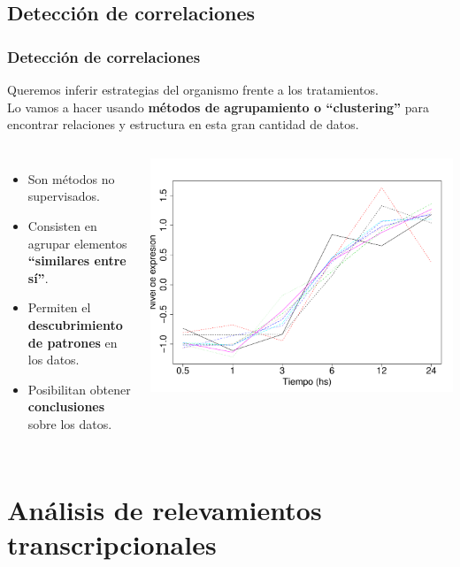\documentclass[serif,9pt, t]{beamer}
\begin{document}
\subsection{Detección de correlaciones}
\begin{frame}\frametitle{Detección de correlaciones} 
Queremos inferir estrategias del organismo frente a los tratamientos.\\\bigskip
Lo vamos a hacer usando \textbf{métodos de agrupamiento o ``clustering''} para encontrar relaciones y estructura en esta gran cantidad de datos.\medskip
\begin{columns}[T]
\begin{itemize}
\item Son métodos no supervisados.
\item Consisten en agrupar elementos \textbf{``similares entre sí''}.
\item Permiten el \textbf{descubrimiento de patrones} en los datos.
\item Posibilitan obtener \textbf{conclusiones} sobre los datos.
\end{itemize}
\centering
\includegraphics[width=1\textwidth]{perfiles_coregulados.pdf}
\end{columns}
\end{frame}

\section{Análisis de relevamientos transcripcionales}
\end{document}
